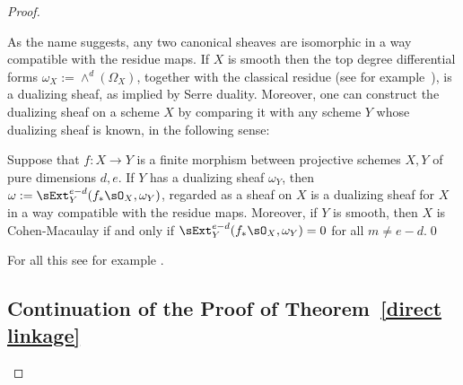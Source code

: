 \begin{proof}
\begin{fact}
As the name suggests, any two canonical sheaves are isomorphic in a way compatible with the
residue maps. If $X$ is smooth then the top degree differential forms $\omega_X :=\wedge^d(\Omega_X)$,
together with the classical residue (see for example~\cite[p. 648, 708]{Griffiths-Harris1978}), is a dualizing sheaf, as implied by Serre duality. Moreover, one can construct the dualizing sheaf on a scheme
$X$ by comparing it with any scheme $Y$ whose dualizing sheaf is known, in the following sense:

\begin{theorem}\label{omega}\label{general adjunction}
Suppose that $f: X\to Y$ is a finite morphism between projective schemes $X,Y$ of pure dimensions $d,e$. If $Y$ has a dualizing sheaf $\omega_Y$,
then $\omega := \sExt_Y^{e-d}(f_*\sO_X,  \omega_Y)$, regarded as a sheaf on $X$ is a dualizing sheaf for $X$ in a way compatible with the residue maps.
Moreover, if $Y$ is smooth, then $X$ is Cohen-Macaulay if and only if $ \sExt_Y^{e-d}(f_*\sO_X,  \omega_Y)= 0$ for all $m\neq e-d$.\qed
\end{theorem}

For all this see for example \cite{AltmanKleiman}.
\end{fact}


\subsection{Continuation of the Proof of Theorem~\ref{direct linkage}}


\end{proof}
